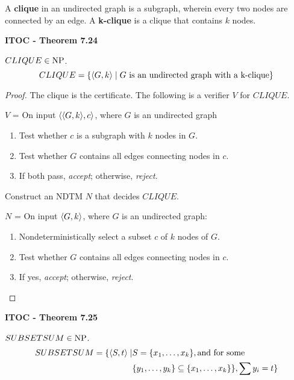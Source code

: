 A \textbf{clique} in an undirected graph is a subgraph, wherein every two nodes are connected by an edge. A \textbf{k-clique} is a clique that contains $k$ nodes.

\label{lang:CLIQUE_NP}
\begin{shaded}
\textbf{ITOC - Theorem 7.24}

\medskip
$CLIQUE \in \text{NP}$.
\[
CLIQUE = \{ \langle{G, k}\rangle \mid \text{$G$ is an undirected graph with a k-clique}\}
\]
\end{shaded}

\begin{mdframed}
\begin{proof}
The clique is the certificate. The following is a verifier $V$ for $CLIQUE$.

\medskip
$V$ = On input $\langle{\langle{G, k}\rangle, c}\rangle$, where $G$ is an undirected graph
\begin{enumerate}
\item Test whether $c$ is a subgraph with $k$ nodes in $G$.
\item Test whether $G$ contains all edges connecting nodes in $c$.
\item If both pass, \textit{accept}; otherwise, \textit{reject}.
\end{enumerate}

Construct an NDTM $N$ that decides $CLIQUE$.

\medskip
$N$ = On input $\langle{G, k}\rangle$, where $G$ is an undirected graph:
\begin{enumerate}
\item Nondeterministically select a subset $c$ of $k$ nodes of $G$.
\item Test whether $G$ contains all edges connecting nodes in $c$.
\item If yes, \textit{accept}; otherwise, \textit{reject}.
\end{enumerate}
\end{proof}
\end{mdframed}

\label{lang:SUBSETSUM_NP}
\begin{shaded}
\textbf{ITOC - Theorem 7.25}

\medskip
$SUBSETSUM \in \text{NP}$.
\begin{align*}
SUBSETSUM = \{ \langle{S, t}\rangle \mid &S = \{ x_1, \ldots, x_k\}, \text{and for some}\\ 
&\{ y_1, \ldots, y_k\} \subseteq \{ x_1, \ldots, x_k\}\}, \sum y_i = t \}
\end{align*}
\end{shaded}

